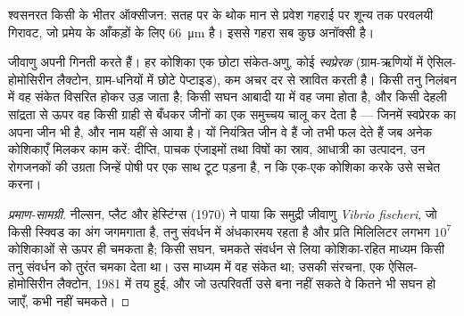 \begin{omfigure}

{\small श्वसनरत किसी  के भीतर ऑक्सीजन: सतह पर के थोक मान से
प्रवेश गहराई पर शून्य तक परवलयी गिरावट, जो प्रमेय के आँकड़ों के लिए
\qty{66}{\micro m} है। इससे गहरा सब कुछ अनॉक्सी है।}
\end{omfigure}

\begin{proposition}[कोरम संवेदन]\label{prop:b2:microbial-metabolism:quorum}
जीवाणु अपनी गिनती करते हैं। हर कोशिका एक छोटा संकेत-अणु, कोई
\emph{स्वप्रेरक} (ग्राम-ऋणियों में ऐसिल-होमोसिरीन लैक्टोन,
ग्राम-धनियों में छोटे पेप्टाइड), कम अचर दर से स्रावित करती है। किसी तनु
निलंबन में वह संकेत विसरित होकर उड़ जाता है; किसी सघन आबादी या
 में वह जमा होता है, और किसी देहली सांद्रता से ऊपर वह किसी
ग्राही से बँधकर जीनों का एक समुच्चय चालू कर देता है --- जिनमें स्वप्रेरक
का अपना जीन भी है, और नाम यहीं से आया है। यों नियंत्रित जीन वे हैं जो
तभी फल देते हैं जब अनेक कोशिकाएँ मिलकर काम करें: दीप्ति, पाचक एंजाइमों
तथा विषों का स्राव, आधात्री का उत्पादन, उन रोगजनकों की उग्रता जिन्हें
पोषी पर एक साथ टूट पड़ना है, न कि एक-एक कोशिका करके उसे सचेत करना।
\end{proposition}
\begin{proof}[प्रमाण-सामग्री]
नील्सन, प्लैट और हेस्टिंग्स (1970) ने पाया कि समुद्री जीवाणु
\emph{Vibrio fischeri}, जो किसी स्क्विड का अंग जगमगाता है, तनु संवर्धन
में अंधकारमय रहता है और प्रति मिलिलिटर लगभग $10^{7}$ कोशिकाओं से ऊपर ही
चमकता है; किसी सघन, चमकते संवर्धन से लिया कोशिका-रहित माध्यम किसी तनु
संवर्धन को तुरंत चमका देता था। उस माध्यम में वह संकेत था; उसकी संरचना,
एक ऐसिल-होमोसिरीन लैक्टोन, 1981 में तय हुई, और जो उत्परिवर्ती उसे बना
नहीं सकते वे कितने भी सघन हो जाएँ, कभी नहीं चमकते।
\end{proof}

